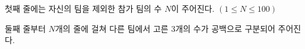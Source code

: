 첫째 줄에는 자신의 팀을 제외한 참가 팀의 수 $N$이 주어진다. $(1 \leq N \leq 100)$

둘째 줄부터 $N$개의 줄에 걸쳐 다른 팀에서 고른 3개의 수가 공백으로 구분되어 주어진다.